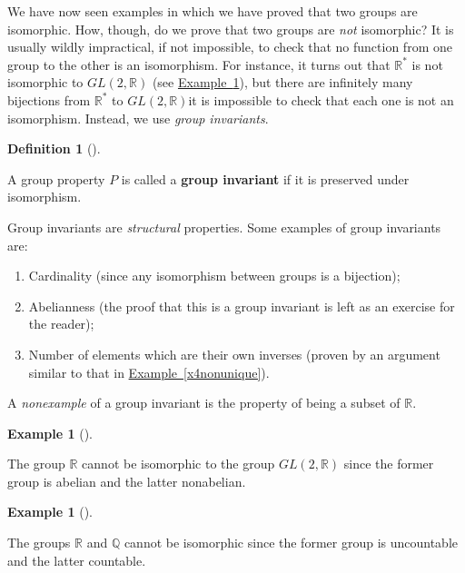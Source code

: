 \documentclass[10pt,]{book}
\newcommand{\terminology}[1]{\textbf{#1}}
\theoremstyle{plain}
\theoremstyle{definition}
\newtheorem{definition}[theorem]{Definition}
\theoremstyle{definition}
\theoremstyle{definition}
\newtheorem{example}[theorem]{Example}
\theoremstyle{definition}
\numberwithin{equation}{section}
\def\R{\mathbb{R}}
\def\Q{\mathbb{Q}}
\begin{document}
    We have now seen examples in which we have proved that two groups
    are isomorphic. How, though, do we prove that two groups are \emph{not} isomorphic? It is usually wildly impractical, if not
    impossible, to check that no function from one group to the other is
    an isomorphism. For instance, it turns out that \(\R^*\) is not
    isomorphic to \(GL(2,\R)\) (see \hyperref[rgl]{Example~\ref{rgl}}), but there are
    infinitely many bijections from \(\R^*\) to \(GL(2,\R)\)\textemdash{}it is
    impossible to check that each one is not an isomorphism. Instead, we
    use \emph{group invariants}.
\begin{definition}[{}]\label{definition-33}

        A group property \(P\) is called a \terminology{group invariant}
        if it is preserved under isomorphism.
\end{definition}
\par

    Group invariants are \emph{structural} properties. Some examples of group invariants are:
    \leavevmode%
\begin{enumerate}
\item\hypertarget{li-151}{}
          Cardinality (since any isomorphism between groups is a bijection);
\item\hypertarget{li-152}{}
          Abelianness (the proof that this is a group invariant is left as an exercise for the reader);
\item\hypertarget{li-153}{}
          Number of elements which are their own inverses (proven by an argument similar to that in \hyperref[x4nonunique]{Example~\ref{x4nonunique}}).
\end{enumerate}

\par

    A \emph{nonexample} of a group invariant is the property of being a subset of \(\R\).
\begin{example}[]\label{rgl}

        The group \(\R\) cannot be isomorphic to the group \(GL(2,\R)\) since the former group is abelian and the latter nonabelian.
\end{example}
\begin{example}[]\label{example-32}

        The groups \(\R\) and \(\Q\) cannot be isomorphic since the former group is uncountable and the latter countable.
\end{example}
\par
\end{document}
